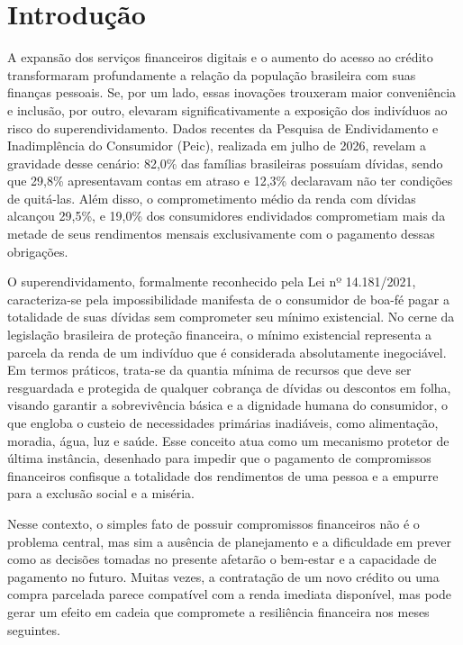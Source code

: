 \documentclass[portuguese]{sbc2025}%
\begin{document}
\section{Introdução}
\label{sec:intro}

A expansão dos serviços financeiros digitais e o aumento do acesso ao crédito transformaram profundamente a relação da população brasileira com suas finanças pessoais. Se, por um lado, essas inovações trouxeram maior conveniência e inclusão, por outro, elevaram significativamente a exposição dos indivíduos ao risco do superendividamento. Dados recentes da Pesquisa de Endividamento e Inadimplência do Consumidor (Peic), realizada em julho de 2026, revelam a gravidade desse cenário: 82,0\% das famílias brasileiras possuíam dívidas, sendo que 29,8\% apresentavam contas em atraso e 12,3\% declaravam não ter condições de quitá-las. Além disso, o comprometimento médio da renda com dívidas alcançou 29,5\%, e 19,0\% dos consumidores endividados comprometiam mais da metade de seus rendimentos mensais exclusivamente com o pagamento dessas obrigações.

O superendividamento, formalmente reconhecido pela Lei nº 14.181/2021, caracteriza-se pela impossibilidade manifesta de o consumidor de boa-fé pagar a totalidade de suas dívidas sem comprometer seu mínimo existencial. No cerne da legislação brasileira de proteção financeira, o mínimo existencial representa a parcela da renda de um indivíduo que é considerada absolutamente inegociável. Em termos práticos, trata-se da quantia mínima de recursos que deve ser resguardada e protegida de qualquer cobrança de dívidas ou descontos em folha, visando garantir a sobrevivência básica e a dignidade humana do consumidor, o que engloba o custeio de necessidades primárias inadiáveis, como alimentação, moradia, água, luz e saúde. Esse conceito atua como um mecanismo protetor de última instância, desenhado para impedir que o pagamento de compromissos financeiros confisque a totalidade dos rendimentos de uma pessoa e a empurre para a exclusão social e a miséria.

Nesse contexto, o simples fato de possuir compromissos financeiros não é o problema central, mas sim a ausência de planejamento e a dificuldade em prever como as decisões tomadas no presente afetarão o bem-estar e a capacidade de pagamento no futuro. Muitas vezes, a contratação de um novo crédito ou uma compra parcelada parece compatível com a renda imediata disponível, mas pode gerar um efeito em cadeia que compromete a resiliência financeira nos meses seguintes.
\end{document}
